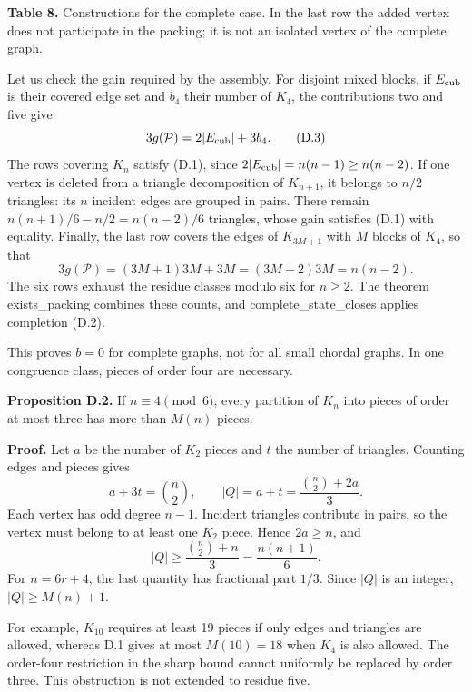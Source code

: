 \documentclass[english,11pt,a4paper]{article}
\begin{document}
\textbf{Table 8.} Constructions for the complete case. In the last row the added vertex does not participate in the packing; it is not an isolated vertex of the complete graph.

Let us check the gain required by the assembly. For disjoint mixed blocks, if \(E_{\rm cub}\) is their covered edge set and \(b_4\) their number of \(K_4\), the contributions two and five give \[
3g(\mathcal P)=2|E_{\rm cub}|+3b_4.
\tag{D.3}
\] The rows covering \(K_n\) satisfy (D.1), since \(2|E_{\rm cub}|=n(n-1)\ge n(n-2)\). If one vertex is deleted from a triangle decomposition of \(K_{n+1}\), it belongs to \(n/2\) triangles: its \(n\) incident edges are grouped in pairs. There remain \(n(n+1)/6-n/2=n(n-2)/6\) triangles, whose gain satisfies (D.1) with equality. Finally, the last row covers the edges of \(K_{3M+1}\) with \(M\) blocks of \(K_4\), so that \[
3g(\mathcal P)=(3M+1)3M+3M=(3M+2)3M=n(n-2).
\tag{D.4}
\] The six rows exhaust the residue classes modulo six for \(n\ge2\). The theorem {\ttfamily\small exists\_\discretionary{\hbox{\ensuremath{\hookrightarrow}}}{}{}packing} combines these counts, and {\ttfamily\small complete\_\discretionary{\hbox{\ensuremath{\hookrightarrow}}}{}{}state\_\discretionary{\hbox{\ensuremath{\hookrightarrow}}}{}{}closes} applies completion (D.2).

This proves \(b=0\) for complete graphs, not for all small chordal graphs. In one congruence class, pieces of order four are necessary.

\textbf{Proposition D.2.} If \(n\equiv4\pmod6\), every partition of \(K_n\) into pieces of order at most three has more than \(M(n)\) pieces.

\textbf{Proof.} Let \(a\) be the number of \(K_2\) pieces and \(t\) the number of triangles. Counting edges and pieces gives \[
a+3t=\binom n2,\qquad |Q|=a+t=\frac{\binom n2+2a}{3}.
\tag{D.5}
\] Each vertex has odd degree \(n-1\). Incident triangles contribute in pairs, so the vertex must belong to at least one \(K_2\) piece. Hence \(2a\ge n\), and \[
|Q|\ge\frac{\binom n2+n}{3}=\frac{n(n+1)}6.
\] For \(n=6r+4\), the last quantity has fractional part \(1/3\). Since \(|Q|\) is an integer, \(|Q|\ge M(n)+1\).

For example, \(K_{10}\) requires at least 19 pieces if only edges and triangles are allowed, whereas D.1 gives at most \(M(10)=18\) when \(K_4\) is also allowed. The order-four restriction in the sharp bound cannot uniformly be replaced by order three. This obstruction is not extended to residue five.
\end{document}

